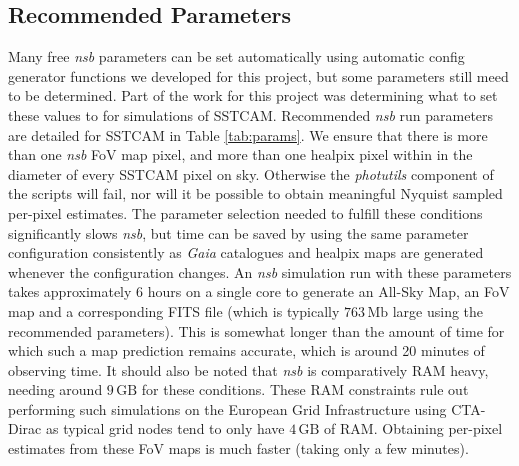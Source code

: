 \subsection{Recommended Parameters}
\label{sec:examples:params}

Many free \textit{nsb} parameters can be set automatically using automatic config generator functions we developed for this project, but some parameters still meed to be determined. Part of the work for this project was determining what to set these values to for simulations of SSTCAM. Recommended \textit{nsb} run parameters are detailed for SSTCAM in Table \ref{tab:params}. We ensure that there is more than one \textit{nsb} FoV map pixel, and more than one healpix pixel within in the diameter of every SSTCAM pixel on sky. Otherwise the \textit{photutils} component of the scripts will fail, nor will it be possible to obtain meaningful Nyquist sampled per-pixel estimates. The parameter selection needed to fulfill these conditions significantly slows \textit{nsb}, but time can be saved by using the same parameter configuration consistently as \textit{Gaia} catalogues and healpix maps are generated whenever the configuration changes. An \textit{nsb} simulation run with these parameters takes approximately 6 hours on a single core to generate an All-Sky Map, an FoV map and a corresponding FITS file (which is typically $\mathrm{763\,Mb}$ large using the recommended parameters). This is somewhat longer than the amount of time for which such a map prediction remains accurate, which is around 20 minutes of observing time. It should also be noted that \textit{nsb} is comparatively RAM heavy, needing around $\mathrm{9\,GB}$ for these conditions. These RAM constraints rule out performing such simulations on the European Grid Infrastructure using CTA-Dirac as typical grid nodes tend to only have $\mathrm{4\,GB}$ of RAM. Obtaining per-pixel estimates from these FoV maps is much faster (taking only a few minutes).

